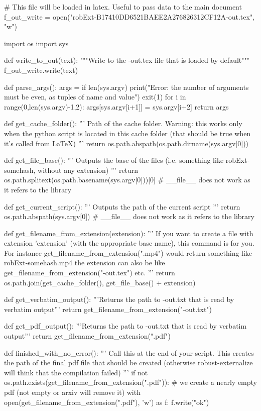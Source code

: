 
# This file will be loaded in latex. Useful to pass data to the main document
f_out_write = open("robExt-B17410DD6521BAEE2A276826312CF12A-out.tex", "w")

import os
import sys

def write_to_out(text):
    """Write to the -out.tex file that is loaded by default"""
    f_out_write.write(text)

def parse_args():
    args = {}
    if len(sys.argv) %
        print("Error: the number of arguments must be even, as tuples of name and value")
        exit(1)
    for i in range(0,len(sys.argv)-1,2):
        args[sys.argv[i+1]] = sys.argv[i+2]
    return args

def get_cache_folder():
    '''
    Path of the cache folder. Warning: this works only when the python script
    is located in this cache folder (that should be true when it's called from LaTeX)
    '''
    return os.path.abspath(os.path.dirname(sys.argv[0]))

def get_file_base():
    '''
    Outputs the base of the files (i.e. something like robExt-somehash, without any extension)
    '''
    return os.path.splitext(os.path.basename(sys.argv[0]))[0] # __file__ does not work as it refers to the library

def get_current_script():
    '''
    Outputs the path of the current script
    '''
    return os.path.abspath(sys.argv[0]) # __file__ does not work as it refers to the library


def get_filename_from_extension(extension):
    '''
    If you want to create a file with extension 'extension' (with the appropriate base name), this command
    is for you. For instance get_filename_from_extension(".mp4") would return something like
    robExt-somehash.mp4
    the extension can also be like get_filename_from_extension("-out.tex") etc.
    '''
    return os.path.join(get_cache_folder(), get_file_base() + extension)

def get_verbatim_output():
    '''Returns the path to -out.txt that is read by verbatim output'''
    return get_filename_from_extension("-out.txt")

def get_pdf_output():
    '''Returns the path to -out.txt that is read by verbatim output'''
    return get_filename_from_extension(".pdf")


def finished_with_no_error():
    '''
    Call this at the end of your script. This creates the path of the final pdf file that should be
    created (otherwise robust-externalize will think that the compilation failed)
    '''
    if not os.path.exists(get_filename_from_extension(".pdf")):
        # we create a nearly empty pdf (not empty or arxiv will remove it)
        with open(get_filename_from_extension(".pdf"), 'w') as f:
            f.write("ok")


